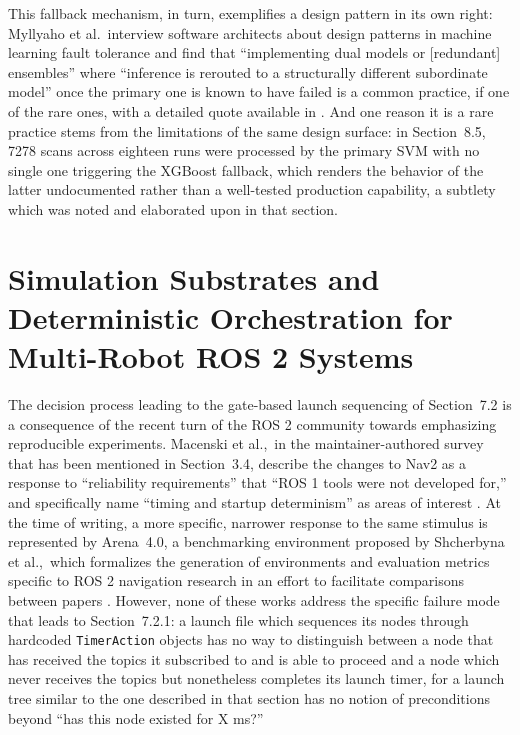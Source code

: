 This fallback mechanism, in turn, exemplifies a design pattern in its own right: Myllyaho et al.\ interview software architects about design patterns in machine learning fault tolerance and find that ``implementing dual models or [redundant] ensembles'' where ``inference is rerouted to a structurally different subordinate model'' once the primary one is known to have failed is a common practice, if one of the rare ones, with a detailed quote available in \cite{myllyaho2022misbehaviour}. And one reason it is a rare practice stems from the limitations of the same design surface: in Section~8.5, 7278 scans across eighteen runs were processed by the primary SVM with no single one triggering the XGBoost fallback, which renders the behavior of the latter undocumented rather than a well-tested production capability, a subtlety which was noted and elaborated upon in that section.

\section{Simulation Substrates and Deterministic Orchestration for Multi-Robot ROS 2 Systems}

The decision process leading to the gate-based launch sequencing of Section~7.2 is a consequence of the recent turn of the ROS 2 community towards emphasizing reproducible experiments. Macenski et al.,\ in the maintainer-authored survey that has been mentioned in Section~3.4, describe the changes to Nav2 as a response to ``reliability requirements'' that ``ROS 1 tools were not developed for,'' and specifically name ``timing and startup determinism'' as areas of interest \cite{macenski2023fromdesks}. At the time of writing, a more specific, narrower response to the same stimulus is represented by Arena~4.0, a benchmarking environment proposed by Shcherbyna et al.,\ which formalizes the generation of environments and evaluation metrics specific to ROS 2 navigation research in an effort to facilitate comparisons between papers \cite{shcherbyna2024arena}. However, none of these works address the specific failure mode that leads to Section~7.2.1: a launch file which sequences its nodes through hardcoded \texttt{TimerAction} objects has no way to distinguish between a node that has received the topics it subscribed to and is able to proceed and a node which never receives the topics but nonetheless completes its launch timer, for a launch tree similar to the one described in that section has no notion of preconditions beyond ``has this node existed for X ms?''


